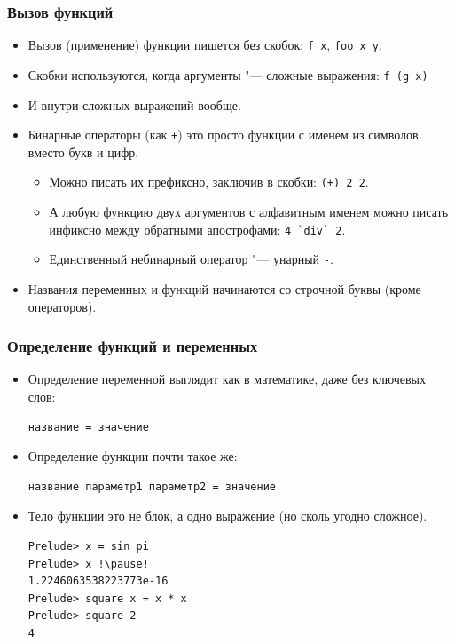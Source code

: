 \documentclass[10pt]{beamer}
\begin{document}
\begin{frame}[fragile]
\frametitle{Вызов функций}
\begin{itemize}
    \item Вызов (применение) функции пишется без скобок: \lstinline|f x|, \lstinline|foo x y|. 
    \item Скобки используются, когда аргументы "--- сложные выражения: \lstinline|f (g x)|
    \item И внутри сложных выражений вообще.
    \item Бинарные операторы (как \lstinline|+|) это просто функции с именем из символов вместо букв и цифр.
    \begin{itemize}
        \item Можно писать их префиксно, заключив в скобки: \lstinline[breaklines=false]|(+) 2 2|.
        \item А любую функцию двух аргументов с алфавитным именем можно писать инфиксно между обратными апострофами:
        \lstinline|4 `div` 2|.
        \item Единственный небинарный оператор "--- унарный \lstinline|-|.
    \end{itemize}
    \item Названия переменных и функций начинаются со строчной буквы (кроме операторов).
\end{itemize}
\end{frame}

\begin{frame}[fragile]
\frametitle{Определение функций и переменных}
\begin{itemize}
    \item Определение переменной выглядит как в математике, даже без ключевых слов:
\begin{lstlisting}
название = значение
\end{lstlisting}
    \item Определение функции почти такое же:
\begin{lstlisting}
название параметр1 параметр2 = значение
\end{lstlisting}
    \item Тело функции это не блок, а одно выражение (но сколь угодно сложное).
\begin{lstlisting}
Prelude> x = sin pi
Prelude> x !\pause!
1.2246063538223773e-16
Prelude> square x = x * x
Prelude> square 2
4
\end{lstlisting}
\end{itemize}
\end{frame}
\end{document}
